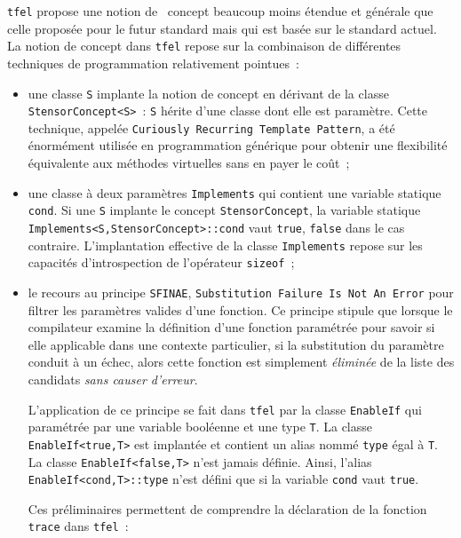 \documentclass[rectoverso,pleiades,pstricks,leqno,anti]{texmf/note_technique_2010}
\newcommand{\tfel}{\texttt{tfel}}
\newcommand{\varcpp}[1]{\texttt{#1}}
\begin{document}
\tfel{} propose une notion de \og~concept\fg{} beaucoup moins étendue et
générale que celle proposée pour le futur standard mais qui est basée
sur le standard actuel. La notion de concept dans \tfel{} repose sur la
combinaison de différentes techniques de programmation relativement
pointues~:
\begin{itemize}
  \item une classe \texttt{S} implante la notion de concept en dérivant
  de la classe \texttt{StensorConcept<S>}~: \texttt{S} hérite d'une
  classe dont elle est paramètre. Cette technique, appelée
  \texttt{Curiously Recurring Template Pattern}, a été énormément
  utilisée en programmation générique pour obtenir une flexibilité
  équivalente aux méthodes virtuelles sans en payer le coût~;
  \item une classe à deux paramètres \texttt{Implements} qui contient
  une variable statique \varcpp{cond}. Si une \texttt{S} implante le
  concept \texttt{StensorConcept}, la variable statique
  \texttt{Implements<S,StensorConcept>::cond} vaut \texttt{true},
  \texttt{false} dans le cas contraire. L'implantation effective de la
  classe \texttt{Implements} repose sur les capacités d'introspection de
  l'opérateur \texttt{sizeof}~;
  \item le recours au principe \texttt{SFINAE}, \texttt{Substitution
    Failure Is Not An Error} pour filtrer les paramètres valides d'une
  fonction. Ce principe stipule que lorsque le compilateur examine la
  définition d'une fonction paramétrée pour savoir si elle applicable
  dans une contexte particulier, si la substitution du paramètre conduit
  à un échec, alors cette fonction est simplement {\em éliminée} de la
  liste des candidats {\em sans causer d'erreur}.

  L'application de ce principe se fait dans \tfel{} par la classe
  \texttt{EnableIf} qui paramétrée par une variable booléenne et une
  type \texttt{T}. La classe \texttt{EnableIf<true,T>} est implantée
  et contient un alias nommé \texttt{type} égal à \texttt{T}. La
  classe \texttt{EnableIf<false,T>} n'est jamais définie. Ainsi,
  l'alias \texttt{EnableIf<cond,T>::type} n'est défini que si la
  variable \texttt{cond} vaut \texttt{true}.

  Ces préliminaires permettent de comprendre la déclaration de la
  fonction \texttt{trace} dans \tfel{}~:


\end{itemize}
\end{document}
